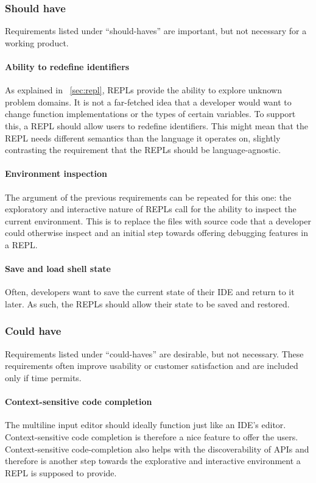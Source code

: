 \subsubsection{Should have}

Requirements listed under ``should-haves'' are important, but not necessary for
a working product.

\paragraph{Ability to redefine identifiers} As explained in ~\cref{sec:repl},
REPLs provide the ability to explore unknown problem domains. It is not a
far-fetched idea that a developer would want to change function implementations
or the types of certain variables. To support this, a REPL should allow users to
redefine identifiers. This might mean that the REPL needs different semantics
than the language it operates on, slightly contrasting the requirement that the
REPLs should be language-agnostic.

\paragraph{Environment inspection} The argument of the previous requirements can
be repeated for this one: the exploratory and interactive nature of REPLs call
for the ability to inspect the current environment. This is to replace the files
with source code that a developer could otherwise inspect and an initial step
towards offering debugging features in a REPL.

\paragraph{Save and load shell state} Often, developers want to save the current
state of their IDE and return to it later. As such, the REPLs should allow their
state to be saved and restored.

\subsubsection{Could have}

Requirements listed under ``could-haves'' are desirable, but not necessary.
These requirements often improve usability or customer satisfaction and are
included only if time permits.

\paragraph{Context-sensitive code completion} The multiline input editor should
ideally function just like an IDE's editor. Context-sensitive code completion is
therefore a nice feature to offer the users. Context-sensitive code-completion
also helps with the discoverability of APIs and therefore is another step
towards the explorative and interactive environment a REPL is supposed to
provide.

